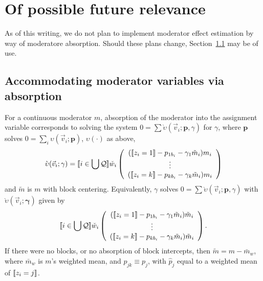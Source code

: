\documentclass{article}
\DeclarePairedDelimiter{\indicator}{\llbracket}{\rrbracket}
\newcommand{\owt}[1][{[z_{i}]}]{\ensuremath{\check{w}_{i#1}}}
\newcommand{\absorbInterceptsEF}{\upsilon}
\newcommand{\absorbModeratorEF}{\grave{\upsilon}}
\begin{document}
\section{Of possible future relevance}

As of this writing, we do not plan to implement moderator effect estimation by way of moderatore absorption.  Should these plans change, Section~\ref{sec:accomm-moder-vari} may be of use.
\subsection{Accommodating moderator variables via absorption}
\label{sec:accomm-moder-vari}


For a continuous moderator $m$, absorption of the moderator into the assignment variable
corresponds to solving the system $0 = \sum
\absorbModeratorEF(\vec{v}_{i}; \mathbf{p},{\gamma})$ for
$\gamma$, where $\mathbf{p}$ solves $0 =
\sum_{i}\absorbInterceptsEF(\vec{v}_{i}; \mathbf{p})$,
$\absorbInterceptsEF(\cdot)$ as above,
\begin{equation}
  \label{eq:18}
    \absorbModeratorEF(\vec{v}_{i}; \mathbf{\gamma})=
    \indicator{i \in \bigcup \mathcal{Q}} \owt[]
     \left(
       \begin{array}{c}
         (
         \indicator{z_{i}=1}-p_{1b_{i}}-\gamma_{1}
         \tilde{m}_{i}
         )m_{i} \\
         \vdots\\
         (\indicator{z_{i}=k}-p_{kb_{i}}
         - \gamma_{k} \tilde{m}_{i})m_{i}\\
       \end{array}
  \right)%
\end{equation}
and $\tilde{m}$ is $m$ with block centering. Equivalently, $\gamma$
solves $0 = \sum
\absorbModeratorEF(\vec{v}_{i}; \mathbf{p},{\gamma})$ with
$\absorbModeratorEF(\vec{v}_{i}; \mathbf{\gamma})$ given by
\begin{equation*}
    \indicator{i \in \bigcup \mathcal{Q}} \owt[]
     \left(
       \begin{array}{c}
         (\indicator{z_{i}=1}-p_{1b_{i}}-\gamma_{1}
         \tilde{m}_{i})\tilde{m}_{i} \\
         \vdots\\
         (\indicator{z_{i}=k}-p_{kb_{i}}
         - \gamma_{k} \tilde{m}_{i})\tilde{m}_{i}\\
       \end{array}
     \right).
\end{equation*}
If there were no blocks,
or no absorption of block intercepts, then $\tilde{m} = m -
\bar{m}_{w}$,  where $\bar{m}_{w}$ is $m$'s weighted mean, and $p_{jk}
\equiv p_{j}$, with $\hat{p}_{j}$ equal to a weighted mean of
$\indicator{z_{i}=j}$.
\end{document}
